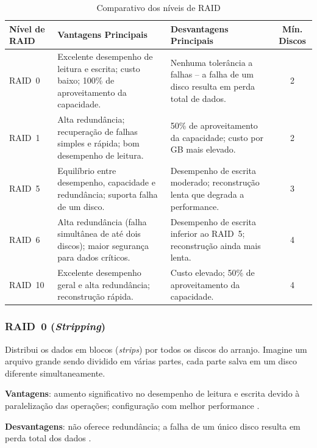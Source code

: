 \begin{table}[H]
  \centering
  \caption{Comparativo dos níveis de RAID}
  \label{tab:niveis-raid}
  \renewcommand{\arraystretch}{1.2}
  \begin{tabular}{|l|p{5.1cm}|p{5.1cm}|c|}
    \hline
    \textbf{Nível de RAID} & \textbf{Vantagens Principais} & \textbf{Desvantagens Principais} & \textbf{Mín. Discos} \\
    \hline
    RAID~0 & Excelente desempenho de leitura e escrita; custo baixo; 100\% de aproveitamento da capacidade. & Nenhuma tolerância a falhas – a falha de um disco resulta em perda total de dados. & 2 \\
    \hline
    RAID~1 & Alta redundância; recuperação de falhas simples e rápida; bom desempenho de leitura. & 50\% de aproveitamento da capacidade; custo por GB mais elevado. & 2 \\
    \hline
    RAID~5 & Equilíbrio entre desempenho, capacidade e redundância; suporta falha de um disco. & Desempenho de escrita moderado; reconstrução lenta que degrada a performance. & 3 \\
    \hline
    RAID~6 & Alta redundância (falha simultânea de até dois discos); maior segurança para dados críticos. & Desempenho de escrita inferior ao RAID~5; reconstrução ainda mais lenta. & 4 \\
    \hline
    RAID~10 & Excelente desempenho geral e alta redundância; reconstrução rápida. & Custo elevado; 50\% de aproveitamento da capacidade. & 4 \\
    \hline
  \end{tabular}
\end{table}

\subsubsection*{RAID~0 (\textit{Stripping})}
Distribui os dados em blocos (\textit{strips}) por todos os discos do arranjo. Imagine um arquivo grande sendo dividido em várias partes, cada parte salva em um disco diferente simultaneamente.

\textbf{Vantagens}: aumento significativo no desempenho de leitura e escrita devido à paralelização das operações; configuração com melhor performance \cite{techtarget2023}.

\textbf{Desvantagens}: não oferece redundância; a falha de um único disco resulta em perda total dos dados \cite{snia2016}.

